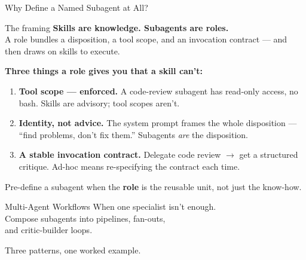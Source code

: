 \documentclass[aspectratio=169, 11pt]{beamer}
\begin{document}
\begin{frame}{Why Define a Named Subagent at All?}
  \begin{block}{The framing}
    \textbf{Skills are knowledge. Subagents are roles.}\\
    A role bundles a disposition, a tool scope, and an invocation contract --- and then draws on skills to execute.
  \end{block}

  \vspace{0.3em}
  \textbf{Three things a role gives you that a skill can't:}
  \begin{enumerate}
    \item \textbf{Tool scope --- enforced.} A code-review subagent has read-only access, no bash. Skills are advisory; tool scopes aren't.
    \item \textbf{Identity, not advice.} The system prompt frames the whole disposition --- ``find problems, don't fix them.'' Subagents \textit{are} the disposition.
    \item \textbf{A stable invocation contract.} Delegate code review $\to$ get a structured critique. Ad-hoc means re-specifying the contract each time.
  \end{enumerate}

  \vspace{0.3em}
  \alert{\small Pre-define a subagent when the \textbf{role} is the reusable unit, not just the know-how.}
\end{frame}


\begin{frame}{Multi-Agent Workflows}
  \centering
  \vspace{2em}
  {\Large When one specialist isn't enough.\\[0.3em]
  Compose subagents into pipelines, fan-outs,\\[0.3em]
  and critic-builder loops.}

  \vspace{2em}
  Three patterns, one worked example.
\end{frame}
\end{document}
